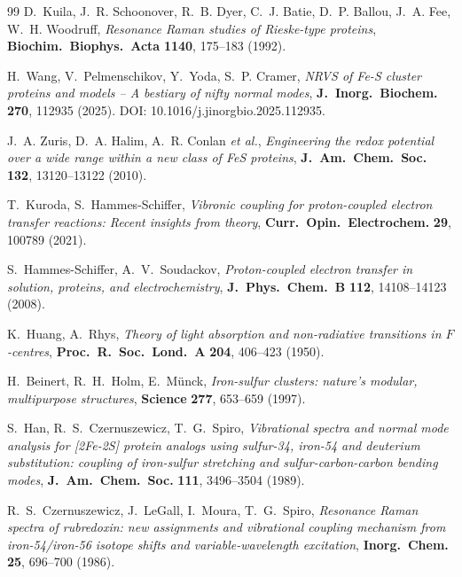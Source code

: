\documentclass[11pt,a4paper,twoside]{article}
\theoremstyle{remark}
\begin{document}
\begin{thebibliography}{99}
D.~Kuila, J.~R. Schoonover, R.~B. Dyer, C.~J. Batie, D.~P. Ballou,
J.~A. Fee, W.~H. Woodruff,
\emph{Resonance {R}aman studies of {R}ieske-type proteins},
\textbf{Biochim.\ Biophys.\ Acta} \textbf{1140}, 175--183 (1992).

H.~Wang, V.~Pelmenschikov, Y.~Yoda, S.~P. Cramer,
\emph{NRVS of {Fe-S} cluster proteins and models -- A bestiary of
nifty normal modes},
\textbf{J.\ Inorg.\ Biochem.} \textbf{270}, 112935 (2025).
DOI: 10.1016/j.jinorgbio.2025.112935.

J.~A. Zuris, D.~A. Halim, A.~R. Conlan \emph{et al.},
\emph{Engineering the redox potential over a wide range within a
new class of FeS proteins},
\textbf{J.\ Am.\ Chem.\ Soc.} \textbf{132}, 13120--13122 (2010).

T.~Kuroda, S.~Hammes-Schiffer,
\emph{Vibronic coupling for proton-coupled electron transfer reactions:
Recent insights from theory},
\textbf{Curr.\ Opin.\ Electrochem.} \textbf{29}, 100789 (2021).


S.~Hammes-Schiffer, A.~V.~Soudackov,
\emph{Proton-coupled electron transfer in solution, proteins, and
electrochemistry},
\textbf{J.\ Phys.\ Chem.\ B} \textbf{112}, 14108--14123 (2008).

K.~Huang, A.~Rhys,
\emph{Theory of light absorption and non-radiative transitions in
$F$-centres},
\textbf{Proc.\ R.\ Soc.\ Lond.\ A} \textbf{204}, 406--423 (1950).

H.~Beinert, R.~H.~Holm, E.~M\"unck,
\emph{Iron-sulfur clusters: nature's modular, multipurpose structures},
\textbf{Science} \textbf{277}, 653--659 (1997).

S.~Han, R.~S.~Czernuszewicz, T.~G.~Spiro,
\emph{Vibrational spectra and normal mode analysis for {[}2Fe-2S{]}
protein analogs using sulfur-34, iron-54 and deuterium substitution:
coupling of iron-sulfur stretching and sulfur-carbon-carbon bending modes},
\textbf{J.\ Am.\ Chem.\ Soc.} \textbf{111}, 3496--3504 (1989).

R.~S.~Czernuszewicz, J.~LeGall, I.~Moura, T.~G.~Spiro,
\emph{Resonance Raman spectra of rubredoxin: new assignments and
vibrational coupling mechanism from iron-54/iron-56 isotope shifts
and variable-wavelength excitation},
\textbf{Inorg.\ Chem.} \textbf{25}, 696--700 (1986).


\end{thebibliography}
\end{document}
